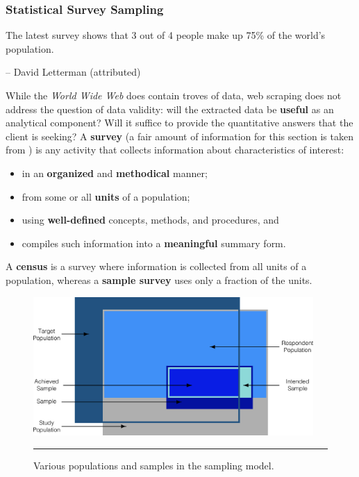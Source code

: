 \subsubsection{Statistical Survey Sampling} 
\begin{tcolorbox}[title=You Can't Say It's Not True]
The latest survey shows that 3 out of 4 people make up 75\% of the world's population.\\[-0.6cm]
\begin{flushright}
-- David Letterman (attributed)
\end{flushright}
\end{tcolorbox}
\noindent
While the \textit{World Wide Web} does contain troves of data, web scraping does not address the question of data validity: will the extracted data be \textbf{useful} as an analytical component? Will it  suffice to provide the quantitative answers that the client is seeking? 
\newl A \textbf{survey} (a fair amount of information for this section is taken from \cite{DC_F,DC_SC}) is any activity that collects information about characteristics of interest:
\begin{itemize}[noitemsep] 
\item in an \textbf{organized} and \textbf{methodical} manner;
\item from some or all \textbf{units} of a population;
\item using \textbf{well-defined} concepts, methods, and procedures, and
\item compiles such information into a \textbf{meaningful} summary form. 
\end{itemize}
A \textbf{census} is a survey where information is collected from all units of a population, whereas a \textbf{sample survey} uses only a fraction of the units. 
\begin{figure}[t!]
\centering
\includegraphics[width=0.95\textwidth]{images/DC/SamplingDesign.png}
\caption[\small The sampling model]{\small Various populations and samples in the sampling model.} \hrule\label{fig:sammod}
\end{figure}
\afterpage{\FloatBarrier}
